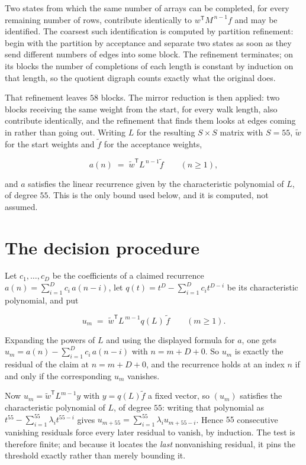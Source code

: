 \documentclass[11pt]{article}
\theoremstyle{definition}
\begin{document}
Two states from which the same number of arrays can be completed, for every remaining number of rows, contribute identically to $w^{\mathsf T}M^{\,n-1}f$ and may be identified. The coarsest such identification is computed by partition refinement: begin with the partition by acceptance and separate two states as soon as they send different numbers of edges into some block. The refinement terminates; on its blocks the number of completions of each length is constant by induction on that length, so the quotient digraph counts exactly what the original does.

That refinement leaves $58$ blocks. The mirror reduction is then applied: two blocks receiving the same weight from the start, for every walk length, also contribute identically, and the refinement that finds them looks at edges coming in rather than going out. Writing $L$ for the resulting $S \times S$ matrix with $S = 55$, $\tilde w$ for the start weights and $\tilde f$ for the acceptance weights,

\[a(n) \;=\; \tilde w^{\mathsf T} L^{\,n-1} \tilde f \qquad (n \ge 1),\]

and $a$ satisfies the linear recurrence given by the characteristic polynomial of $L$, of degree $55$. This is the only bound used below, and it is computed, not assumed.

\section{The decision procedure}

Let $c_1,\dots,c_D$ be the coefficients of a claimed recurrence $a(n) = \sum_{i=1}^{D} c_i\,a(n-i)$, let $q(t) = t^{D} - \sum_{i=1}^{D} c_i t^{D-i}$ be its characteristic polynomial, and put

\[u_m \;=\; \tilde w^{\mathsf T} L^{\,m-1} q(L)\,\tilde f \qquad (m \ge 1).\]

Expanding the powers of $L$ and using the displayed formula for $a$, one gets $u_m = a(n) - \sum_{i=1}^{D} c_i\,a(n-i)$ with $n = m + D + 0$. So $u_m$ is exactly the residual of the claim at $n = m + D + 0$, and the recurrence holds at an index $n$ if and only if the corresponding $u_m$ vanishes.

Now $u_m = \tilde w^{\mathsf T} L^{m-1} y$ with $y = q(L)\tilde f$ a fixed vector, so $(u_m)$ satisfies the characteristic polynomial of $L$, of degree $55$: writing that polynomial as $t^{55} - \sum_{i=1}^{55} \lambda_i t^{55-i}$ gives $u_{m+55} = \sum_{i=1}^{55} \lambda_i u_{m+55-i}$. Hence $55$ consecutive vanishing residuals force every later residual to vanish, by induction. The test is therefore finite; and because it locates the {\itshape last} nonvanishing residual, it pins the threshold exactly rather than merely bounding it.
\end{document}

